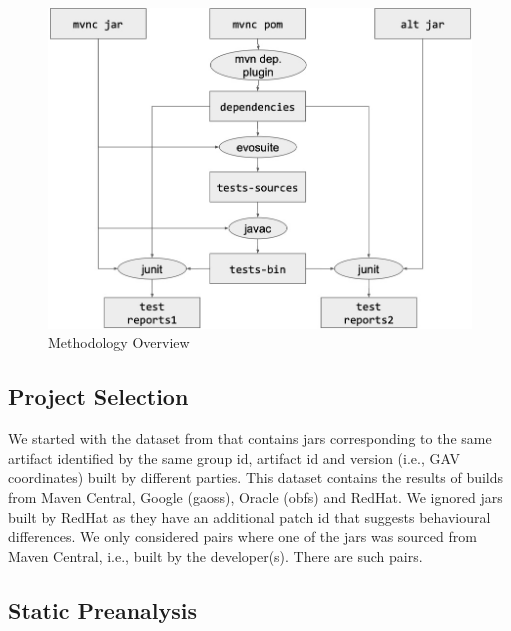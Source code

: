 \documentclass[conference]{IEEEtran}
\newcommand{\inputgen}[1]{\unskip}
\begin{document}
\begin{figure}[ht!]
	\centering
	\includegraphics[width=\columnwidth]{methodology.jpg}
	\caption{Methodology Overview \label{fig:methodology}}
\end{figure}


\subsection{Project Selection}

We started with the dataset from \cite{dietrich2024levelsbinaryequivalencecomparison} that contains jars corresponding to the same artifact identified by the same group id, artifact id and version (i.e., GAV coordinates) built by different parties. This dataset contains the results of builds from Maven Central, Google (gaoss), Oracle (obfs) and  RedHat. We ignored jars built by RedHat as they have an additional patch id that suggests behavioural differences.  We only considered pairs where one of the jars was sourced from Maven Central, i.e., built by the developer(s). There are \inputgen{num-pairs-of-binaries} such pairs.


\subsection{Static Preanalysis}
\end{document}
